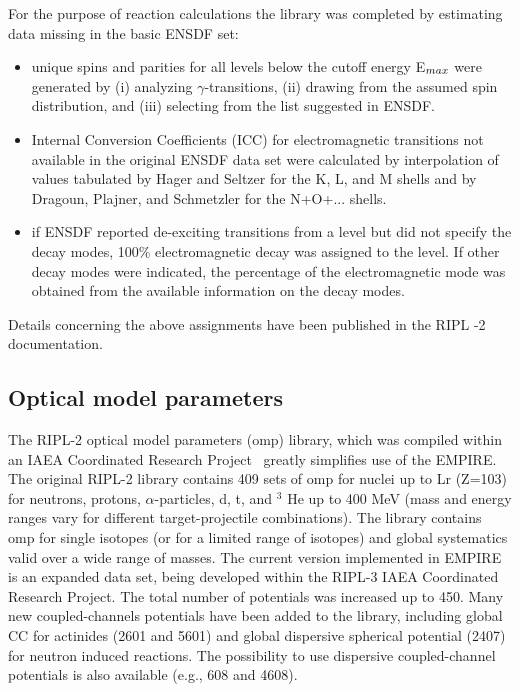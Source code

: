 For the purpose of reaction calculations the library was completed by
estimating data missing in the basic ENSDF set:

\begin{itemize}
\item unique spins and parities for all levels below the cutoff energy E$_{{%
max}}$ were generated by (i) analyzing $\gamma$-transitions, (ii) drawing
from the assumed spin distribution, and (iii) selecting from the list
suggested in ENSDF.

\item Internal Conversion Coefficients (ICC) for electromagnetic transitions
not available in the original ENSDF data set were calculated by
interpolation of values tabulated by Hager and Seltzer for the K, L, and M
shells and by Dragoun, Plajner, and Schmetzler for the N+O+... shells.

\item if ENSDF reported de-exciting transitions from a level but did not
specify the decay modes, 100\% electromagnetic decay was assigned to the
level. If other decay modes were indicated, the percentage of the
electromagnetic mode was obtained from the available information on the
decay modes.
\end{itemize}

Details concerning the above assignments have been published in the RIPL%
-2 documentation.

\subsection{Optical model parameters\label{sec:RIPLomp}}

The RIPL-2 optical model parameters (omp) library, which was compiled within
an IAEA Coordinated Research Project~\cite{RIPL2} greatly simplifies use of
the EMPIRE. The original RIPL-2 library contains 409 sets of omp for nuclei
up to Lr (Z=103) for neutrons, protons, $\alpha$-particles, d, t, and $^{3}$%
He up to 400 MeV (mass and energy ranges vary for different
target-projectile combinations). The library contains omp for single
isotopes (or for a limited range of isotopes) and global systematics valid
over a wide range of masses. The current version implemented in EMPIRE is an
expanded data set, being developed within the RIPL-3 IAEA Coordinated
Research Project. The total number of potentials was increased up to 450.
Many new coupled-channels potentials have been added to the library,
including global CC for actinides (2601 and 5601) and global dispersive
spherical potential (2407) for neutron induced reactions. The possibility to
use dispersive coupled-channel potentials is also available (e.g., 608 and
4608).

